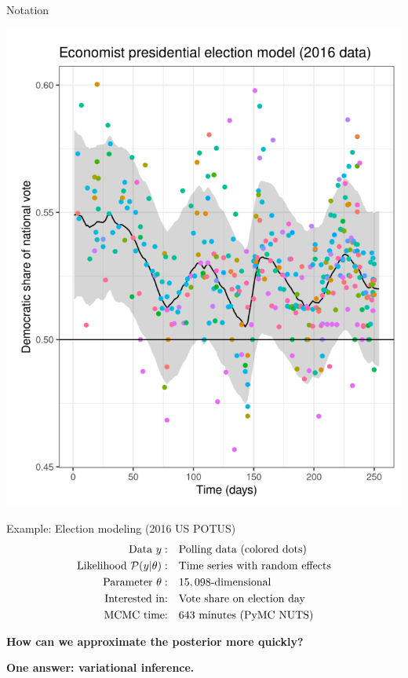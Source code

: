 \documentclass[8pt]{beamer}\usepackage[]{graphicx}\usepackage[]{color}
\begin{document}
\begin{frame}[t]{Notation}
\begin{minipage}{0.35\textwidth}
\includegraphics[width=\linewidth]{static_figures/election_data}
\end{minipage}
\begin{minipage}{0.63\textwidth}
    Example: Election modeling (2016 US POTUS)
    \begin{align*}
        \text{Data } y:&\quad \textrm{Polling data (colored dots)} \\
        \text{Likelihood } \mathcal{P}(y \vert \theta):&\quad \textrm{Time series with random effects}\\
        \text{Parameter }\theta:& \quad 15,098\textrm{-dimensional}\\
        \text{Interested in:}& \quad\textrm{Vote share on election day}\\
        \text{MCMC time:}& \quad 643 \textrm{ minutes (PyMC NUTS)}
    \end{align*}

    \textbf{How can we approximate the posterior more quickly?}

    \textbf{One answer: variational inference.}

\end{minipage}

\end{frame}
\end{document}
